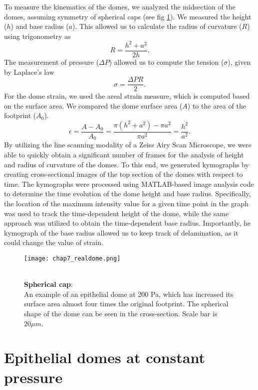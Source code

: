 To measure the kinematics of the domes, we analyzed the midsection of the domes, assuming symmetry of spherical caps (see fig \ref{fig_7_1}). We measured the height ($h$) and base radius ($a$). This allowed us to calculate the radius of curvature ($R$) using trigonometry as 
$$ R = \frac{h^2 + a^2}{2h}.$$ 
The measurement of pressure ($\Delta P$) allowed us to compute the tension ($\sigma$), given by Laplace's law 
$$\sigma = \frac{\Delta PR }{2} .$$
For the dome strain, we used the areal strain measure, which is computed based on the surface area. We compared the dome surface area ($A$) to the area of the footprint ($A_{0}$).
$$ \epsilon = \frac{A - A_{0}}{A_{0}} = \frac{\pi(h^2 + a^2) - \pi a^2}{\pi a^2} = \frac{h^2}{a^2} .$$
By utilizing the line scanning modality of a Zeiss Airy Scan Microscope, we were able to quickly obtain a significant number of frames for the analysis of height and radius of curvature of the domes. To this end, we generated kymographs by creating cross-sectional images of the top section of the domes with respect to time. The kymographs were processed using MATLAB-based image analysis code to determine the time evolution of the dome height and base radius. Specifically, the location of the maximum intensity value for a given time point in the graph was used to track the time-dependent height of the dome, while the same approach was utilized to obtain the time-dependent base radius. Importantly, he kymograph of the base radius allowed us to keep track of delamination, as it could change the value of strain.

\begin{figure}
	\begin{minipage}[c]{0.7\textwidth}
		\texttt{[image: chap7\_realdome.png]}
	\end{minipage}\hfill
	\begin{minipage}[c]{0.27\textwidth}
		\caption{\\ \textbf{Spherical cap}:\\An example of an epithelial dome at 200 Pa, which has increased its surface area almost four times the original footprint. The spherical shape of the dome can be seen in the cross-section. Scale bar is  $20 \mu m$.
		} \label{fig_7_1}
	\end{minipage}
\end{figure}

\hypertarget{epithelial-domes-at-constant-pressure}{%
	\section{Epithelial domes at constant
		pressure}\label{epithelial-domes-at-constant-pressure}}

